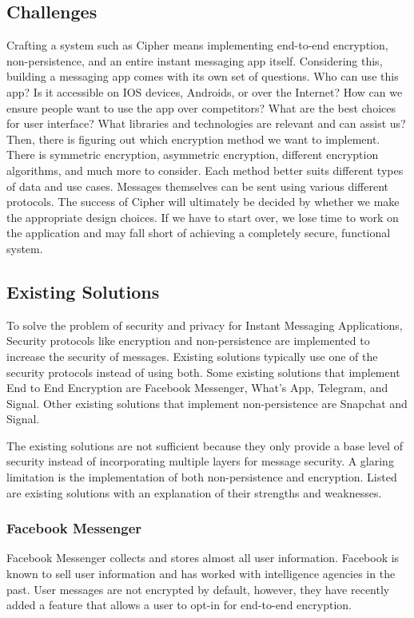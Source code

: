 \documentclass[12pt]{article}
\begin{document}
\subsection{Challenges} 
Crafting a system such as Cipher means implementing end-to-end encryption, non-persistence, and an entire instant messaging app itself. Considering this, building a messaging app comes with its own set of questions. Who can use this app? Is it accessible on IOS devices, Androids, or over the Internet? How can we ensure people want to use the app over competitors? What are the best choices for user interface? What libraries and technologies are relevant and can assist us? Then, there is figuring out which encryption method we want to implement. There is symmetric encryption, asymmetric encryption, different encryption algorithms, and much more to consider. Each method better suits different types of data and use cases. Messages themselves can be sent using various different protocols. The success of Cipher will ultimately be decided by whether we make the appropriate design choices. If we have to start over, we lose time to work on the application and may fall short of achieving a completely secure, functional system.


\vspace{0.5cm}

\subsection{Existing Solutions}

To solve the problem of security and privacy for Instant Messaging Applications, Security protocols like encryption and non-persistence are implemented to increase the security of messages. Existing solutions typically use one of the security protocols instead of using both. Some existing solutions that implement End to End Encryption are Facebook Messenger, What’s App, Telegram, and Signal. Other existing solutions that implement non-persistence are Snapchat and Signal.

The existing solutions are not sufficient because they only provide a base level of security instead of incorporating multiple layers for message security. A glaring limitation is the implementation of both non-persistence and encryption. Listed are existing solutions with an explanation of their strengths and weaknesses.
\subsubsection{Facebook Messenger}
Facebook Messenger collects and stores almost all user information. Facebook is known to sell user information and has worked with intelligence agencies in the past. User messages are not encrypted by default, however, they have recently added a feature that allows a user to opt-in for end-to-end encryption.
\end{document}
